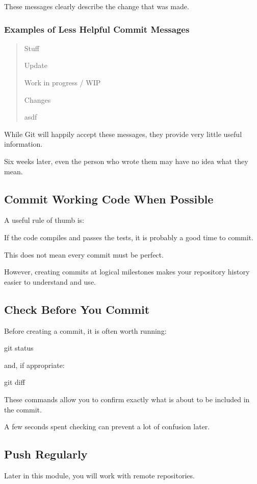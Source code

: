 \documentclass{csc2059practical}
\begin{document}
These messages clearly describe the change that was made.

\subsubsection{Examples of Less Helpful Commit Messages}

\begin{quote}
  
  Stuff
  
  Update
  
  Work in progress / WIP
  
  Changes
  
  asdf
\end{quote}

While Git will happily accept these messages, they provide very little useful information.

Six weeks later, even the person who wrote them may have no idea what they mean.

\subsection{Commit Working Code When Possible}
A useful rule of thumb is:

If the code compiles and passes the tests, it is probably a good time to commit.

This does not mean every commit must be perfect.

However, creating commits at logical milestones makes your repository history easier to understand and use.

\subsection{Check Before You Commit}
Before creating a commit, it is often worth running:

\begin{terminalplain}
git status
\end{terminalplain}
and, if appropriate:

\begin{terminalplain}
git diff
\end{terminalplain}
These commands allow you to confirm exactly what is about to be included in the commit.

A few seconds spent checking can prevent a lot of confusion later.

\subsection{Push Regularly}
Later in this module, you will work with remote repositories.
\end{document}
